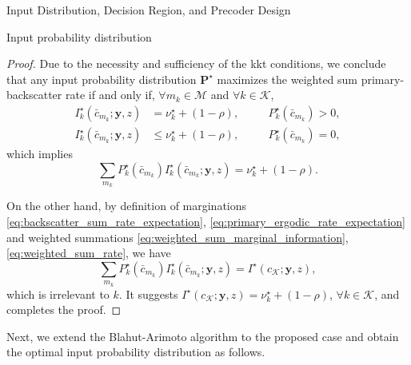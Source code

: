 \documentclass[journal]{IEEEtran}
\begin{document}
\begin{section}{Input Distribution, Decision Region, and Precoder Design}
\begin{subsection}{Input probability distribution}
\begin{proof}
				Due to the necessity and sufficiency of the \gls{kkt} conditions, we conclude that any input probability distribution $\boldsymbol{P}^{\star}$ maximizes the weighted sum primary-backscatter rate if and only if, $\forall m_k \in \mathcal{M}$ and $\forall k \in \mathcal{K}$,
				\begin{subequations}
					\begin{alignat}{2}
						I_k^{\star}(\bar{c}_{m_k};\boldsymbol{y},z) & = \nu_k^{\star} + (1 - \rho), \quad && P_k^{\star}(\bar{c}_{m_k}) > 0,\label{eq:probable_states_marginal}\\
						I_k^{\star}(\bar{c}_{m_k};\boldsymbol{y},z) & \le \nu_k^{\star} + (1 - \rho), \quad && P_k^{\star}(\bar{c}_{m_k}) = 0,\label{eq:dropped_states_marginal}
					\end{alignat}
				\end{subequations}
				which implies
				\begin{equation}
					\sum_{m_k} P_k^{\star}(\bar{c}_{m_k}) I_k^{\star}(\bar{c}_{m_k};\boldsymbol{y},z) = \nu_k^{\star} + (1 - \rho).
				\end{equation}

				On the other hand, by definition of marginations \eqref{eq:backscatter_sum_rate_expectation}, \eqref{eq:primary_ergodic_rate_expectation} and weighted summations \eqref{eq:weighted_sum_marginal_information}, \eqref{eq:weighted_sum_rate}, we have
				\begin{equation}
					\sum_{m_k} P_k^{\star}(\bar{c}_{m_k}) I_k^{\star}(\bar{c}_{m_k};\boldsymbol{y},z) = I^{\star}(c_{\mathcal{K}};\boldsymbol{y},z),
				\end{equation}
				which is irrelevant to $k$. It suggests $I^{\star}(c_{\mathcal{K}};\boldsymbol{y},z) = \nu_k^{\star} + (1 - \rho)$, $\forall k \in \mathcal{K}$, and completes the proof.
			\end{proof}

			Next, we extend the Blahut-Arimoto algorithm to the proposed case and obtain the optimal input probability distribution as follows.


\end{subsection}
\end{section}
\end{document}
